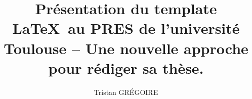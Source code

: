 \documentclass{book}
\title{Pr\'esentation du template \LaTeX\ au PRES de l'universit\'e Toulouse -- Une nouvelle approche pour r\'ediger sa th\`ese.}
\author{Tristan GR\'EGOIRE}
\begin{document}
    \makeflyleaf
\end{document}
